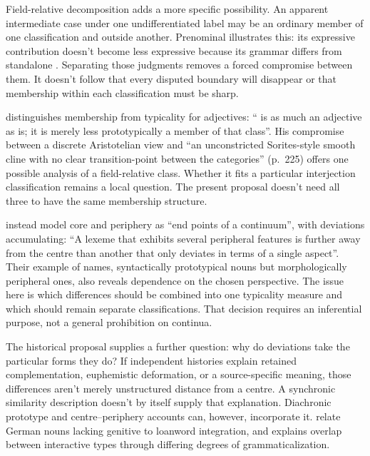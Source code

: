 \documentclass[12pt]{article}
\begin{document}
Field-relative decomposition adds a more specific possibility. An apparent intermediate case under one undifferentiated label may be an ordinary member of one classification and outside another. Prenominal  illustrates this: its expressive contribution doesn't become less expressive because its grammar differs from standalone . Separating those judgments removes a forced compromise between them. It doesn't follow that every disputed boundary will disappear or that membership within each classification must be sharp.

\textcite[206]{aarts2007} distinguishes membership from typicality for adjectives: \enquote{ is as much an adjective as  is; it is merely less prototypically a member of that class}. His compromise between a discrete Aristotelian view and \enquote{an unconstricted Sorites-style smooth cline with no clear transition-point between the categories} (p.~225) offers one possible analysis of a field-relative class. Whether it fits a particular interjection classification remains a local question. The present proposal doesn't need all three to have the same membership structure.

\textcite[5]{zimmerackermann2025} instead model core and periphery as \enquote{end points of a continuum}, with deviations accumulating: \enquote{A lexeme that exhibits several peripheral features is further away from the centre than another that only deviates in terms of a single aspect}. Their example of names, syntactically prototypical nouns but morphologically peripheral ones, also reveals dependence on the chosen perspective. The issue here is which differences should be combined into one typicality measure and which should remain separate classifications. That decision requires an inferential purpose, not a general prohibition on continua.

The historical proposal supplies a further question: why do deviations take the particular forms they do? If independent histories explain retained complementation, euphemistic deformation, or a source-specific meaning, those differences aren't merely unstructured distance from a centre. A synchronic similarity description doesn't by itself supply that explanation. Diachronic prototype and centre--periphery accounts can, however, incorporate it. \textcite[8]{zimmerackermann2025} relate German nouns lacking genitive  to loanword integration, and \textcite[48]{heine2023interactives} explains overlap between interactive types through differing degrees of grammaticalization.
\end{document}
